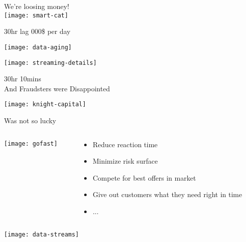\documentclass[aspectratio=169, 15pt,usenames,dvipsnames]{beamer}
\begin{document}
\begin{gdsw}
	\centering\Large We're loosing money!\\
	\texttt{[image: smart-cat]} 
	\par\centering
	\pause
	30hr lag  000\$ per day
\end{gdsw}
\begin{gdsw}
\end{gdsw}	
\begin{gdsw}
\end{gdsw}
\begin{gdsw}
	\centering\texttt{[image: data-aging]} 
\end{gdsw}
\begin{gdsw}
	\centering\texttt{[image: streaming-details]} 
	\par\pause\Large
	30hr \rightarrow \Rightarrow 10mins\\
	And Fraudsters were Disappointed
\end{gdsw}
\begin{gdsw}
	\centering\texttt{[image: knight-capital]} 
	\par
	Was not so lucky
\end{gdsw}
\begin{gdsw}		
	\begin{columns}
		\begin{column}{0.4\textwidth}
			\centering\texttt{[image: gofast]} 
		\end{column}
		\begin{column}{0.6\textwidth}
			\large\centering 
			\begin{itemize}
				\item Reduce reaction time
				\item Minimize risk surface
				\item Compete for best offers in market
				\item Give out customers what they need right in time
				\item ...
			\end{itemize}	
		\end{column}
	\end{columns}
\end{gdsw}
\begin{gdsw}
	\centering\texttt{[image: data-streams]}         
\end{gdsw}
\end{document}
